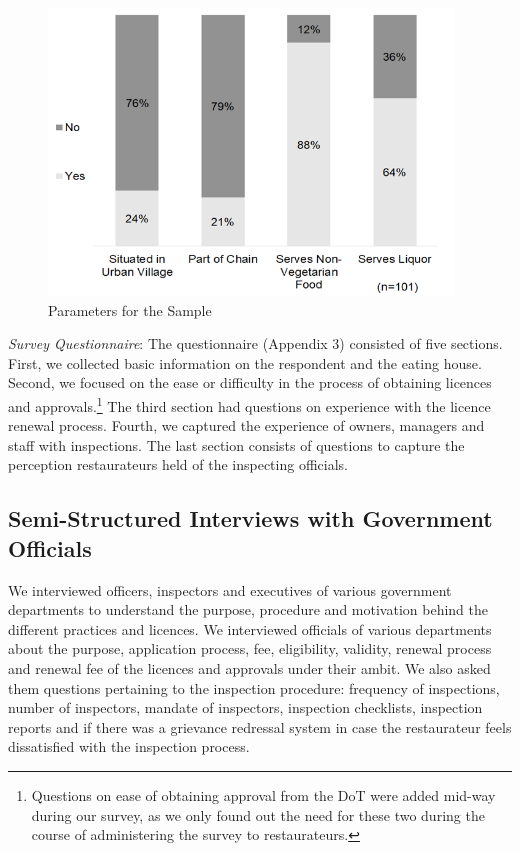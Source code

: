 \documentclass[a4paper, 12pt]{article}
\begin{document}
		\begin{figure}[H]
                    	\centering
                    	\includegraphics[height = 3in]{Figure9.png}
                    	\caption[Optional Caption]{Parameters for the Sample}%
		\end{figure}

		\textit{Survey Questionnaire}: The questionnaire (Appendix 3) consisted of five sections. First, we collected basic information on the respondent and the eating house. Second, we focused on the ease or difficulty in the process of obtaining licences and 
approvals.\footnote{Questions on ease of obtaining approval from the DoT were added mid-way during our survey, as we only found out the need for these two during the course of administering the survey to restaurateurs.} The third section had questions on 
experience with the licence renewal process. Fourth, we captured the experience of owners, managers and staff with inspections. The last section consists of questions to capture the perception restaurateurs held of the inspecting officials.

		\subsection*{Semi-Structured Interviews with Government Officials}
		We interviewed officers, inspectors and executives of various government departments to understand the purpose, procedure and motivation behind the different practices and licences. We interviewed officials of various departments about the purpose, 
application process, fee, eligibility, validity, renewal process and renewal fee of the licences and approvals under their ambit. We also asked them questions pertaining to the inspection procedure: frequency of inspections, number of inspectors, mandate of 
inspectors, inspection checklists, inspection reports and if there was a grievance redressal system in case the restaurateur feels dissatisfied with the inspection process.
		
\end{document}
